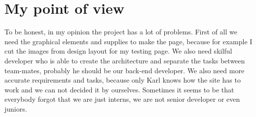 \documentclass[english]{article}
\begin{document}
\section{My point of view}

To be honest, in my opinion the project has a lot of problems. First of all we need the graphical elements and supplies to make the page, because for example I cut the images from design layout for my testing page. We also need skilful developer who is able to create the architecture and separate the tasks between team-mates, probably he should be our back-end developer. We also need more accurate requirements and tasks, because only Karl knows how the site has to work and we can not decided it by ourselves. Sometimes it seems to be that everybody forgot that we are just interns, we are not senior developer or even juniors.
\end{document}
